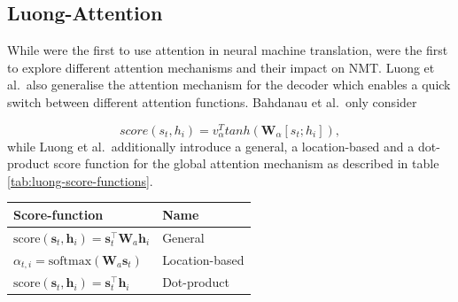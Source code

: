 \documentclass[]{krantz}
\begin{document}
\hypertarget{luong-attention}{%
\subsection{Luong-Attention}\label{luong-attention}}

While \citet{bahdanau2014neural} were the first to use attention in neural machine translation,
\citet{luong2015effective} were the first to explore different attention mechanisms and their impact on
NMT. Luong et al.~also generalise the attention mechanism for the decoder which enables
a quick switch between different attention functions.
Bahdanau et al.~only consider

\[
score(s_t,h_i) = v_\alpha^Ttanh(\mathbf{W}_\alpha[s_t;h_i]),
\]
while Luong et al.~additionally introduce a general, a location-based and a dot-product score function for the global attention mechanism as described in table \ref{tab:luong-score-functions}.

\begin{longtable}[]{@{}ll@{}}
\toprule
\begin{minipage}[b]{0.47\columnwidth}\raggedright
Score-function\strut
\end{minipage} & \begin{minipage}[b]{0.47\columnwidth}\raggedright
Name\strut
\end{minipage}\tabularnewline
\midrule
\endhead
\begin{minipage}[t]{0.47\columnwidth}\raggedright
\(\text{score}(\boldsymbol{s}_t, \boldsymbol{h}_i) = \boldsymbol{s}_t^\top\mathbf{W}_a\boldsymbol{h}_i\)\strut
\end{minipage} & \begin{minipage}[t]{0.47\columnwidth}\raggedright
General\strut
\end{minipage}\tabularnewline
\begin{minipage}[t]{0.47\columnwidth}\raggedright
\(\alpha_{t,i} = \text{softmax}(\mathbf{W}_a \boldsymbol{s}_t)\)\strut
\end{minipage} & \begin{minipage}[t]{0.47\columnwidth}\raggedright
Location-based\strut
\end{minipage}\tabularnewline
\begin{minipage}[t]{0.47\columnwidth}\raggedright
\(\text{score}(\boldsymbol{s}_t, \boldsymbol{h}_i) = \boldsymbol{s}_t^\top\boldsymbol{h}_i\)\strut
\end{minipage} & \begin{minipage}[t]{0.47\columnwidth}\raggedright
Dot-product\strut
\end{minipage}\tabularnewline
\bottomrule
\end{longtable}
\end{document}
